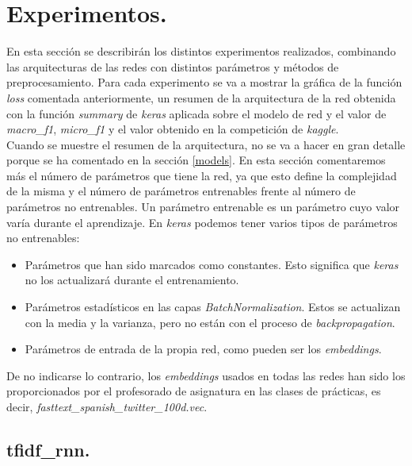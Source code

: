 \documentclass[11pt]{article}
\begin{document}
\label{pretrainedembeddingscnnbidirectionalLSTM}
 

\section{Experimentos.}

En esta sección se describirán los distintos experimentos realizados, combinando las arquitecturas de las redes con distintos parámetros y métodos de preprocesamiento. Para cada experimento se va a mostrar la gráfica de la función \textit{loss} comentada anteriormente, un resumen de la arquitectura de la red obtenida con la función \textit{summary} de \textit{keras} aplicada sobre el modelo de red y el valor de \textit{macro\_f1}, \textit{micro\_f1} y el valor obtenido en la competición de \textit{kaggle}. \\

Cuando se muestre el resumen de la arquitectura, no se va a hacer en gran detalle porque se ha comentado en la sección \ref{models}. En esta sección comentaremos más el número de parámetros que tiene la red, ya que esto define la complejidad de la misma y el número de parámetros entrenables frente al número de parámetros no entrenables. Un parámetro entrenable es un parámetro cuyo valor varía durante el aprendizaje. En \textit{keras} podemos tener varios tipos de parámetros no entrenables:

\begin{itemize}
    \item Parámetros que han sido marcados como constantes. Esto significa que \textit{keras} no los actualizará durante el entrenamiento.
    \item Parámetros estadísticos en las capas \textit{BatchNormalization}. Estos se actualizan con la media y la varianza, pero no están con el proceso de \textit{backpropagation}.
    \item Parámetros de entrada de la propia red, como pueden ser los \textit{embeddings}.
\end{itemize}

De no indicarse lo contrario, los \textit{embeddings} usados en todas las redes han sido los proporcionados por el profesorado de asignatura en las clases de prácticas, es decir, \textit{fasttext\_spanish\_twitter\_100d.vec}.

\subsection{tfidf\_rnn.} \label{exp_tfidfrnn}
\end{document}
